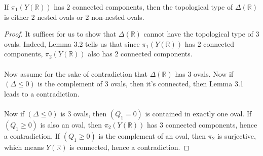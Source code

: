\documentclass{article}
\newcommand{\Rbb}{\mathbb{R}}
\begin{document}
\begin{proposition}
If $\pi_1(Y(\Rbb))$ has $2$ connected components, then the topological type of $\Delta(\Rbb)$ is either $2$ nested ovals or $2$ non-nested ovals.
\end{proposition}

\begin{proof}
It suffices for us to show that $\Delta(\Rbb)$ cannot have the topological type of $3$ ovals. Indeed, Lemma 3.2 tells us that since $\pi_1(Y(\Rbb))$ has $2$ connected components, $\pi_2(Y(\Rbb))$ also has $2$ connected components.\\\\
Now assume for the sake of contradiction that $\Delta(\Rbb)$ has 3 ovals. Now if $(\Delta \leq 0)$ is the complement of 3 ovals, then it's connected, then Lemma 3.1 leads to a contradiction.\\\\
Now if $(\Delta \leq 0)$ is 3 ovals, then $(Q_1 = 0)$ is contained in exactly one oval. If $(Q_1 \geq 0)$ is also an oval, then $\pi_2(Y(\Rbb))$ has 3 connected components, hence a contradiction. If $(Q_1 \geq 0)$ is the complement of an oval, then $\pi_2$ is surjective, which means $Y(\Rbb)$ is connected, hence a contradiction.
\end{proof}
\end{document}

